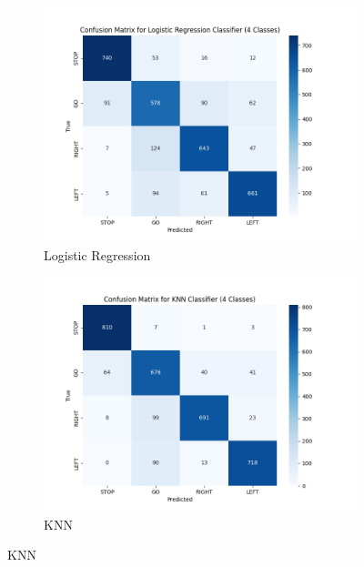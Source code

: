 \begin{figure}[h]
\centering
\begin{subfigure}{0.48\textwidth}
    \includegraphics[width=\linewidth]{img/classifier/logistic_regression_confucion_matrix.png}
    \caption{Logistic Regression}
\end{subfigure}
\begin{subfigure}{0.48\textwidth}
    \includegraphics[width=\linewidth]{img/classifier/KNN_confucion_matrix.png}
    \caption{KNN}
\end{subfigure}

\vspace{0.5em}


\end{figure}
